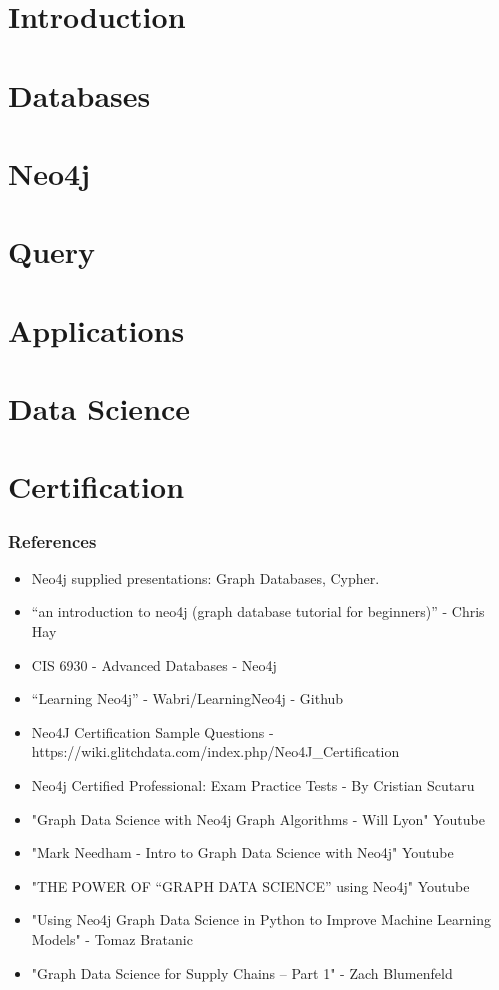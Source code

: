 \section[Intro]{Introduction}



\section[Db]{Databases}


\section[Neo4j]{Neo4j}


\section[Query]{Query}


\section[Apps]{Applications}


\section[DS]{Data Science}




\section[Cert]{Certification}


\begin{frame}\frametitle{References}
\begin{itemize}
\item Neo4j supplied presentations: Graph Databases, Cypher.
\item ``an introduction to neo4j (graph database tutorial for beginners)'' - Chris Hay
\item CIS 6930 - Advanced Databases - Neo4j 
\item ``Learning Neo4j'' - Wabri/LearningNeo4j - Github
\item Neo4J Certification Sample Questions - https://wiki.glitchdata.com/index.php/Neo4J\_Certification
\item Neo4j Certified Professional: Exam Practice Tests - By Cristian Scutaru
\item "Graph Data Science with Neo4j Graph Algorithms - Will Lyon" Youtube
\item "Mark Needham - Intro to Graph Data Science with Neo4j" Youtube
\item "THE POWER OF “GRAPH DATA SCIENCE” using Neo4j" Youtube
\item "Using Neo4j Graph Data Science in Python to Improve Machine Learning Models" - Tomaz Bratanic 
\item "Graph Data Science for Supply Chains – Part 1" - Zach Blumenfeld
\end{itemize}
\end{frame}